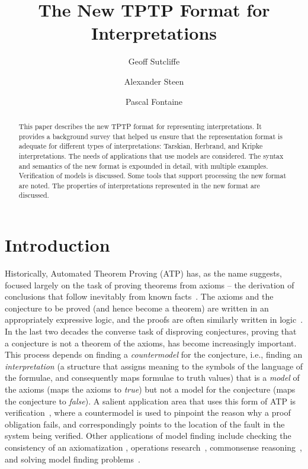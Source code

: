 \documentclass{easychair}
\title{The New TPTP Format for Interpretations}
\author{
  Geoff Sutcliffe\inst{1}
\and
  Alexander Steen\inst{2}
\and
  Pascal Fontaine\inst{3}
}
\institute{
  University of Miami,
  Miami, USA\\
  \email{geoff@cs.miami.edu}
\and
  University of Greifswald,
  Greifswald, Germany\\
  \email{alexander.steen@uni-greifswald.de}
\and
  University of Li{\`e}ge,
  Li{\`e}ge, Belgium\\
  \email{Pascal.Fontaine@uliege.be}
}
\begin{document}
\maketitle
\begin{abstract}
This paper describes the new TPTP format for representing interpretations.
It provides a background survey that helped us ensure that the representation format is adequate
for different types of interpretations: Tarskian, Herbrand, and Kripke interpretations.
The needs of applications that use models are considered.
The syntax and semantics of the new format is expounded in detail, with multiple examples.
Verification of models is discussed.
Some tools that support processing the new format are noted.
The properties of interpretations represented in the new format are discussed.
\end{abstract}
\section{Introduction}
\label{Introduction}

Historically, Automated Theorem Proving (ATP) has, as the name suggests, focused largely on the
task of proving theorems from axioms -- the derivation of conclusions that follow inevitably 
from known facts~\cite{RV01-HAR}.
The axioms and the conjecture to be proved (and hence become a theorem) are written in an 
appropriately expressive logic, and the proofs are often similarly written in logic~\cite{SS+06}.
In the last two decades the converse task of disproving conjectures, proving that a conjecture is 
not a theorem of the axioms, has become increasingly important.
This process depends on finding a \emph{countermodel} for the conjecture, i.e., finding an 
\emph{interpretation} (a structure that assigns meaning to the symbols of the language of the
formulae, and consequently maps formulae to truth values) that is a \emph{model} of the axioms 
(maps the axioms to \textit{true}) but not a model for the conjecture (maps the conjecture to 
\textit{false}).
A salient application area that uses this form of ATP is verification~\cite{DKW08}, where a 
countermodel is used to pinpoint the reason why a proof obligation fails, and correspondingly 
points to the location of the fault in the system being verified.
Other applications of model finding include checking the consistency of an axiomatization 
\cite{SS+17}, operations research~\cite{Hoo93}, commonsense reasoning~\cite{KR94}, and solving 
model finding problems~\cite{Win82}.
\end{document}
